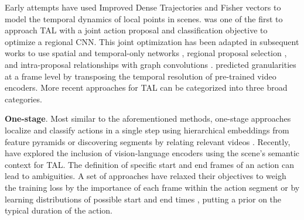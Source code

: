 Early attempts have used Improved Dense Trajectories \citep{wang2013action} and Fisher vectors \citep{oneata2013action} to model the temporal dynamics of local points in scenes. \citet{shou2016temporal} was one of the first to approach TAL with a joint action proposal and classification objective to optimize a regional CNN. This joint optimization has been adapted in subsequent works to use spatial and temporal-only networks \citep{lin2018bsn,paul2018w,wang2017untrimmednets}, regional proposal selection \citep{chao2018rethinking,xu2017r}, and intra-proposal relationships with graph convolutions \citep{zeng2019graph}. \citet{shou2017cdc} predicted granularities at a frame level by transposing the temporal resolution of pre-trained video encoders. More recent approaches for TAL can be categorized into three broad categories. 

\noindent
\textbf{One-stage}. Most similar to the aforementioned methods, one-stage approaches localize and classify actions in a single step using hierarchical embeddings from feature pyramids \citep{lin2021learning,liu2020progressive,shi2023tridet,zhang2022actionformer} or discovering segments by relating relevant videos \citep{shou2018autoloc,yang2020localizing}. Recently, \citet{yan2023unloc} have explored the inclusion of vision-language encoders using the scene's semantic context for TAL. The definition of specific start and end frames of an action can lead to ambiguities. A set of approaches have relaxed their objectives to weigh the training loss by the importance of each frame within the action segment \citep{shao2023action} or by
learning distributions of possible start and end times \citep{moltisanti2019action}, putting a prior on the typical duration of the action. 

